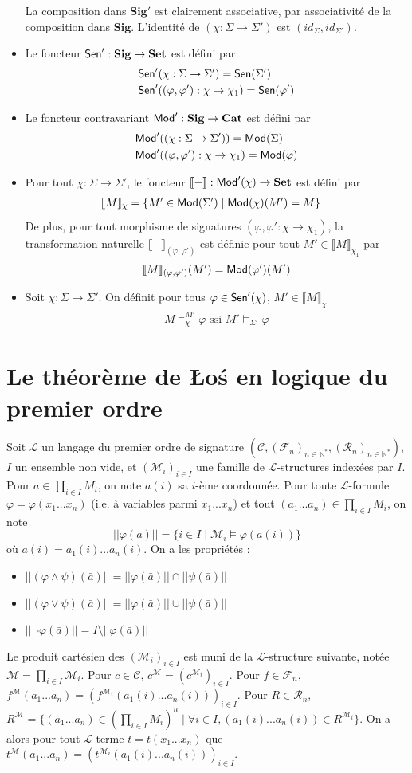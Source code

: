 \documentclass[11pt,a4paper]{report}
\newcommand{\La}{\mathcal{L}}
\newcommand{\M}{\mathcal{M}}
\newcommand{\ph}{\varphi}
\newcommand{\itemz}{\item[$\triangleright$]}
\newcommand{\F}{\mathcal{F}}
\newcommand{\gr}{\textbf}
\newcommand{\N}{\mathbb{N}}
\newcommand{\R}{\mathcal{R}}
\newcommand{\C}{\mathcal{C}}
\newcommand{\lb}{\llbracket}
\newcommand{\rb}{\rrbracket}
\newcommand{\info}[1]{\text{{\fontfamily{lmss}\selectfont #1}}}
\newcommand{\Mod}{\info{Mod}}
\newcommand{\Sen}{\info{Sen}}
\newcommand{\1}{\mathbbm{1}}
\begin{document}
\begin{itemize}
La composition dans $\gr{Sig}'$ est clairement associative, par associativité de la composition dans $\gr{Sig}$. L'identité de $(\chi : \Sigma \to \Sigma')$ est $(id_\Sigma,id_{\Sigma'})$.
\itemz Le foncteur $\Sen' : \gr{Sig} \to \gr{Set}$ est défini par
\begin{align*}
&\Sen'(\chi : \Sigma \to \Sigma') = \Sen(\Sigma') \\
&\Sen'((\ph,\ph') : \chi \to \chi_1) = \Sen(\ph') 
\end{align*}
\itemz Le foncteur contravariant $\Mod' : \gr{Sig} \to \gr{Cat}$ est défini par 
\begin{align*} 
& \Mod'((\chi : \Sigma \to \Sigma')) = \Mod(\Sigma) \\
& \Mod'((\ph,\ph') : \chi \to \chi_1) = \Mod(\ph)
\end{align*}
\itemz Pour tout $\chi : \Sigma \to \Sigma'$, le foncteur $\lb - \rb : \Mod'(\chi) \to \gr{Set}$ est défini par
\begin{align*}
& \lb M \rb_\chi = \{ M' \in \Mod(\Sigma') \mid \Mod(\chi)(M') = M \}
\end{align*}
De plus, pour tout morphisme de signatures $(\ph,\ph' : \chi \to \chi_1)$, la transformation naturelle $\lb - \rb_{(\ph,\ph')}$ est définie pour tout $M' \in \lb M \rb_{\chi_1}$ par
\[ \lb M \rb_{(\ph,\ph')}(M') = \Mod(\ph')(M') \]
\itemz Soit $\chi : \Sigma \to \Sigma'$. On définit pour tous $\ph \in \Sen'(\chi)$, $M' \in \lb M \rb_\chi$
\begin{align*}
M \models_\chi^{M'} \ph \text{ ssi } M' \models_{\Sigma'} \ph
\end{align*}
\end{itemize}


\chapter{Le théorème de \L o\'s en logique du premier ordre}
Soit $\La$ un langage du premier ordre de signature $(\C,(\F_n)_{n\in \N^*}, (\R_n)_{n\in \N^*})$, $I$ un ensemble non vide, et $(\M_i)_{i\in I}$ une famille de $\La$-structures indexées par $I$. Pour $a \in \prod_{i\in I} M_i$, on note $a(i)$ sa $i$-ème coordonnée. Pour toute $\La$-formule $\ph = \ph(x_1...x_n)$ (i.e. à variables parmi $x_1...x_n$) et tout $(a_1...a_n) \in \prod_{i\in I} M_i$, on note 
\[ ||\ph(\bar{a})|| = \{ i \in I \mid \M_i \models \ph(\bar{a}(i))\} \]
où $\bar{a}(i) = a_1(i)...a_n(i)$. On a les propriétés :
\begin{itemize}
\setlength\itemsep{-0.3em}
\itemz $|| (\ph \wedge \psi) (\bar{a}) || = || \ph (\bar{a}) || \cap || \psi (\bar{a}) ||$
\itemz $|| (\ph \vee \psi) (\bar{a}) || = || \ph (\bar{a}) || \cup || \psi (\bar{a}) ||$
\itemz $|| \neg\ph (\bar{a}) || = I \setminus || \ph (\bar{a}) ||$
\end{itemize}
Le produit cartésien des $(\M_i)_{i\in I}$ est muni de la $\La$-structure suivante, notée $\M = \prod_{i\in I} \M_i$. Pour $c \in \C$, $c^\M = (c^{\M_i})_{i\in I}$. Pour $f \in \F_n$, $f^\M(a_1...a_n) = (f^{\M_i}(a_1(i)...a_n(i)))_{i\in I}$. Pour $R \in \R_n$, $R^\M = \{(a_1...a_n) \in (\prod_{i\in I} M_i)^n \mid \forall i \in I, (a_1(i)...a_n(i)) \in R^{\M_i}\}$. On a alors pour tout $\La$-terme $t = t(x_1...x_n)$ que $t^\M (a_1...a_n) = (t^{\M_i}(a_1(i)...a_n(i)))_{i\in I}$.
\end{document}
